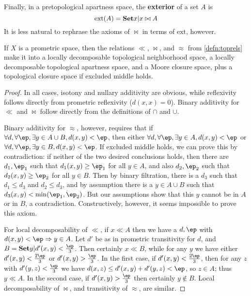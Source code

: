 \documentclass{article}
\def\ext{\mathrm{ext}}
\let\implies\Rightarrow
\def\fep#1#2{\frac{\if1#1\else#1\fi\ep}{#2}}
\begin{document}
Finally, in a pretopological apartness space, the \textbf{exterior} of a set $A$ is
\[ \ext(A) = \setof{ x | x\bowtie A } \]
It is less natural to rephrase the axioms of $\bowtie$ in terms of $\ext$, however.

\begin{thm}\label{thm:pmet-top}
  If $X$ is a prometric space, then the relations $\ll$, $\bowtie$, and $\approx$ from \cref{defn:toprels} make it into a locally decomposable topological neighborhood space, a locally decomposable topological apartness space, and a Moore closure space, plus a topological closure space if excluded middle holds.
\end{thm}
\begin{proof}
  In all cases, isotony and nullary additivity are obvious, while reflexivity follows directly from prometric reflexivity ($d(x,x)=0$).
  Binary additivity for $\ll$ and $\bowtie$ follow directly from the definitions of $\cap$ and $\cup$.

  Binary additivity for $\approx$, however, requires that if $\forall d,\forall \ep, \exists y\in A\cup B, d(x,y)<\ep$, then either $\forall d,\forall \ep, \exists y\in A, d(x,y)<\ep$ or $\forall d,\forall \ep, \exists y\in B, d(x,y)<\ep$.
  If excluded middle holds, we can prove this by contradiction: if neither of the two desired conclusions holds, then there are $d_1,\ep_1$ such that $d_1(x,y)\ge \ep_1$ for all $y\in A$, and also $d_2,\ep_2$ such that $d_2(x,y)\ge\ep_2$ for all $y\in B$.
  Then by binary filtration, there is a $d_3$ such that $d_1\le d_3$ and $d_2\le d_3$, and by assumption there is a $y\in A\cup B$ such that $d_3(x,y)<\min(\ep_1,\ep_2)$.
  But our assumptions show that this $y$ cannot be in $A$ or in $B$, a contradiction.
  Constructively, however, it seems impossible to prove this axiom.

  For local decomposability of $\ll$, if $x\ll A$ then we have a $d,\ep$ with $d(x,y)<\ep \implies y\in A$.
  Let $d'$ be as in prometric transitivity for $d$, and $B = \setof{ y | d'(x,y) < \fep13}$.
  Then certainly $x\ll B$, while for any $y$ we have either $d'(x,y)<\fep23$ or $d'(x,y)>\fep13$.
  In the first case, if $d'(x,y)<\fep23$, then for any $z$ with $d'(y,z)<\fep13$ we have $d(x,z) \le d'(x,y)+d'(y,z) <\ep$, so $z\in A$; thus $y\ll A$.
  In the second case, if $d'(x,y)>\fep13$ then certainly $y\notin B$.
  Local decomposability of $\bowtie$, and transitivity of $\approx$, are similar.
\end{proof}
\end{document}

